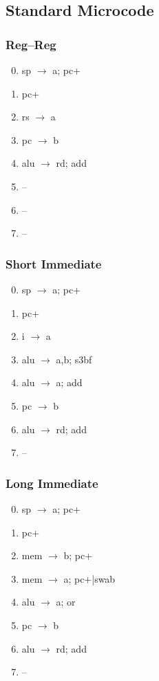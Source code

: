 \documentclass[11pt]{book}
\begin{document}
\subsection*{Standard Microcode}
\begin{multicols}{3}\ttfamily\selectfont\small
  \subsubsection*{Reg--Reg}
  \begin{enumerate}\setcounter{enumi}{-1}
  \item sp \(\rightarrow\) a; pc+
  \item pc+
  \item rs \(\rightarrow\) a
  \item pc \(\rightarrow\) b
  \item alu \(\rightarrow\) rd; add
  \item --
  \item --
  \item --
  \end{enumerate}
  \columnbreak
  \subsubsection*{Short Immediate}
  \begin{enumerate}\setcounter{enumi}{-1}
  \item sp \(\rightarrow\) a; pc+
  \item pc+
  \item i \(\rightarrow\) a
  \item alu \(\rightarrow\) a,b; s3bf
  \item alu \(\rightarrow\) a; add
  \item pc \(\rightarrow\) b
  \item alu \(\rightarrow\) rd; add
  \item --
  \end{enumerate}
  \columnbreak
  \subsubsection*{Long Immediate}
  \begin{enumerate}\setcounter{enumi}{-1}
  \item sp \(\rightarrow\) a; pc+
  \item pc+
  \item mem \(\rightarrow\) b; pc+
  \item mem \(\rightarrow\) a; pc+|swab
  \item alu \(\rightarrow\) a; or
  \item pc \(\rightarrow\) b
  \item alu \(\rightarrow\) rd; add
  \item --
  \end{enumerate}
\end{multicols}
\end{document}
